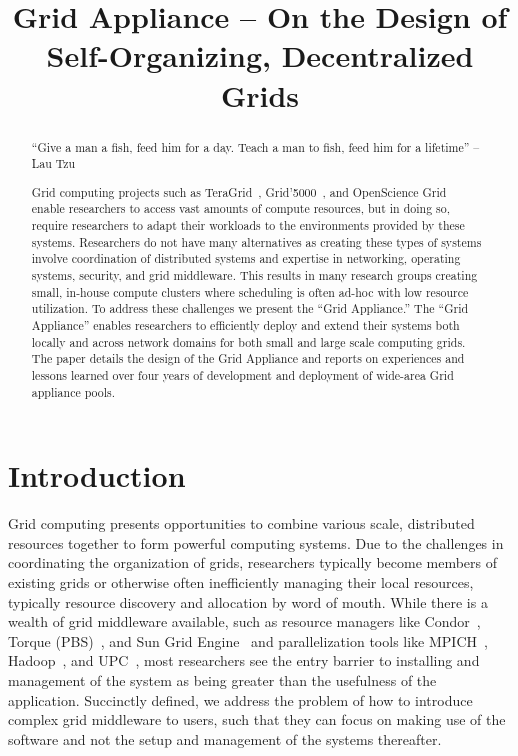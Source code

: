\documentclass[conference]{IEEEtran}
\begin{document}
\title{Grid Appliance -- On the Design of Self-Organizing,
Decentralized Grids}

\author{
}

\maketitle


\begin{abstract}

``Give a man a fish, feed him for a day.  Teach a man to fish, feed him for a
lifetime'' -- Lau Tzu

Grid computing projects such as TeraGrid~\cite{teragrid},
Grid'5000~\cite{grid_5000}, and OpenScience Grid~\cite{osg} enable researchers
to access vast amounts of compute resources, but in doing so, require
researchers to adapt their workloads to the environments provided by these
systems.  Researchers do not have many alternatives as creating these types of
systems involve coordination of distributed systems and expertise in
networking, operating systems, security, and grid middleware.  This results in
many research groups creating small, in-house compute clusters where scheduling
is often ad-hoc with low resource utilization.  To address these challenges we
present the ``Grid Appliance.''  The ``Grid Appliance'' enables researchers to
efficiently deploy and extend their systems both locally and across network
domains for both small and large scale computing grids.  The paper details the
design of the Grid Appliance and reports on experiences and lessons learned
over four years of development and deployment of wide-area Grid appliance
pools.

\end{abstract}

\section{Introduction}

Grid computing presents opportunities to combine various scale, distributed
resources together to form powerful computing systems.  Due to the challenges
in coordinating the organization of grids, researchers typically become members
of existing grids or otherwise often inefficiently managing their local
resources, typically resource discovery and allocation by word of mouth.  While
there is a wealth of grid middleware available, such as resource managers like
Condor~\cite{condor0}, Torque (PBS)~\cite{torque}, and Sun Grid
Engine~\cite{grid_engine} and parallelization tools like MPICH~\cite{mpich},
Hadoop~\cite{hadoop}, and UPC~\cite{upc}, most researchers see the entry
barrier to installing and management of the system as being greater than the
usefulness of the application.  Succinctly defined, we address the problem of
how to introduce complex grid middleware to users, such that they can focus on
making use of the software and not the setup and management of the systems
thereafter.
\end{document}
